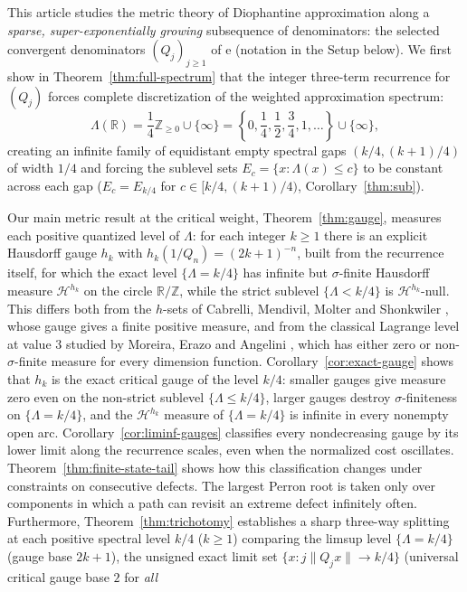 \documentclass[11pt]{article}
\theoremstyle{definition}
\theoremstyle{remark}
\newcommand{\R}{\mathbb{R}}
\newcommand{\Z}{\mathbb{Z}}
\newcommand{\ee}{\mathrm{e}}
\newcommand{\Lam}{\Lambda}
\begin{document}
This article studies the metric theory of Diophantine approximation along a
\emph{sparse, super-exponentially growing} subsequence of denominators: the
selected convergent denominators $(Q_j)_{j\ge1}$ of $\ee$ (notation in the
Setup below). We first show in Theorem~\ref{thm:full-spectrum} that the integer
three-term recurrence for $(Q_j)$ forces complete discretization of the weighted
approximation spectrum:
\[
\Lam(\R)=\frac14\Z_{\ge0}\cup\{\infty\}
=\left\{0,\frac14,\frac12,\frac34,1,\dots\right\}\cup\{\infty\},
\]
creating an infinite family of equidistant empty spectral gaps
$(k/4,(k+1)/4)$ of width $1/4$ and forcing the sublevel sets
$E_c=\{x:\Lam(x)\le c\}$ to be constant across each gap
($E_c=E_{k/4}$ for $c\in[k/4,(k+1)/4)$, Corollary~\ref{thm:sub}).

Our main metric result at the critical weight, Theorem~\ref{thm:gauge},
measures each positive quantized level of $\Lam$: for each integer $k\ge1$
there is an explicit Hausdorff gauge $h_k$ with $h_k(1/Q_n)=(2k+1)^{-n}$, built
from the recurrence itself, for which the exact level $\{\Lam=k/4\}$ has
infinite but $\sigma$-finite Hausdorff measure $\mathcal H^{h_k}$ on the circle
$\R/\Z$, while the strict sublevel $\{\Lam<k/4\}$ is $\mathcal H^{h_k}$-null.
This differs both from the $h$-sets of Cabrelli, Mendivil, Molter and
Shonkwiler \cite[\S5, Theorem~3]{CMMS}, whose gauge gives a finite positive
measure, and from the classical Lagrange level at value $3$ studied by Moreira,
Erazo and Angelini \cite{MEA}, which has either zero or non-$\sigma$-finite
measure for every dimension function. Corollary~\ref{cor:exact-gauge} shows
that $h_k$ is the exact critical gauge of the level $k/4$: smaller gauges give
measure zero even on the non-strict sublevel $\{\Lam\le k/4\}$, larger gauges
destroy $\sigma$-finiteness on $\{\Lam=k/4\}$, and the $\mathcal H^{h_k}$
measure of $\{\Lam=k/4\}$ is infinite in every nonempty open arc.
Corollary~\ref{cor:liminf-gauges} classifies every nondecreasing gauge by
its lower limit along the recurrence scales, even when the normalized
cost oscillates. Theorem~\ref{thm:finite-state-tail} shows how this
classification changes under constraints on consecutive defects.
The largest Perron root is taken only over components in which a path
can revisit an extreme defect infinitely often.
Furthermore, Theorem~\ref{thm:trichotomy} establishes a sharp three-way
splitting at each positive spectral level $k/4$ ($k\ge1$) comparing the limsup
level $\{\Lam=k/4\}$ (gauge base $2k+1$), the unsigned exact limit set
$\{x:j\|Q_jx\|\to k/4\}$ (universal critical gauge base $2$ for \emph{all}
\end{document}
